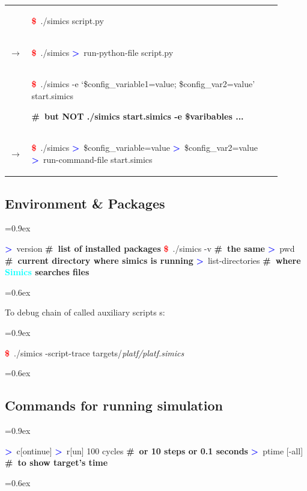 \documentclass[8pt]{extarticle}
\newenvironment{code}[1][]{%
\begin{prebox}[#1]\obeylines%
\fontdimen2\font=0.9ex%
}{%
\end{prebox}%
\fontdimen2\font=0.6ex%
}
\newenvironment{codem}[2][\linewidth]{%
\begin{minipage}{#1}%
\begin{prebox}[colback=#2]\obeylines}{%
\end{prebox}%
\end{minipage}}
\newenvironment{code9}{%
\begin{codem}[0.9\linewidth]{green!10}}{\end{codem}}
\newcommand{\cod}[2][green!10]{\tcbox[
    size=fbox,
    on line,
    colback=#1,
    colframe=black,
    arc=0.3em  %
]{#2}}
\newcommand{\ind}{\hphantom{~~~}}
\newcommand{\prompt}{\textcolor{red}{\textbf{\$}\ }}
\newcommand{\sprompt}{\textcolor{blue}{\textbf{>}\ }}
\newcommand{\cmtcommon}[1]{\textcolor{Sepia}{\textbf{#1}}}
\newcommand{\cmt}[1]{\cmtcommon{\#\ #1}}
\newcommand{\p}[1]{\textit{\large#1}}
\newcommand{\Simics}{\textcolor{cyan}{\textbf{Simics}}}
\begin{document}
\begin{multicols*}{3}
\begin{tabular}{p{0.05\linewidth}p{0.85\linewidth}}
        & \begin{code9}
            \prompt ./simics script.py
        \end{code9}
        \vspace{0.05cm}
        \\
        $\longrightarrow$ &
        \begin{code9}
            \prompt ./simics
            \sprompt run-python-file script.py
        \end{code9}
        \vspace{0.2cm}
        \\

        & \begin{code9}
            \prompt ./simics -e ‘\$config_variable1=value; \$config_var2=value’ start.simics

            \cmt{but NOT ./simics start.simics -e \$varibables ...}
        \end{code9}
        \vspace{0.05cm}
        \\
        $\longrightarrow$ &
        \begin{code9}
            \prompt ./simics
            \sprompt \$config_variable=value
            \sprompt \$config_var2=value
            \sprompt run-command-file start.simics
        \end{code9}
    \end{tabular}

\subsection{Environment \& Packages}
    \begin{code}
        \sprompt version  \cmt{list of installed packages}
        \prompt ./simics -v \cmt{the same}
        \sprompt pwd \cmt{current directory where simics is running}
        \sprompt list-directories \cmt{where \Simics{} searches files}
    \end{code}


    To debug chain of called auxiliary scripts \cod{include}s:
    \begin{code}
        \prompt ./simics -script-trace targets/\p{platf/platf.simics}
    \end{code}

\subsection{Commands for running simulation}
\begin{code}
\sprompt c[ontinue]
\sprompt r[un] 100 cycles \ind \cmt{or 10 steps or 0.1 seconds}
\sprompt ptime [-all] \ind \cmt{to show target's time}
\end{code}


\end{multicols*}
\end{document}
